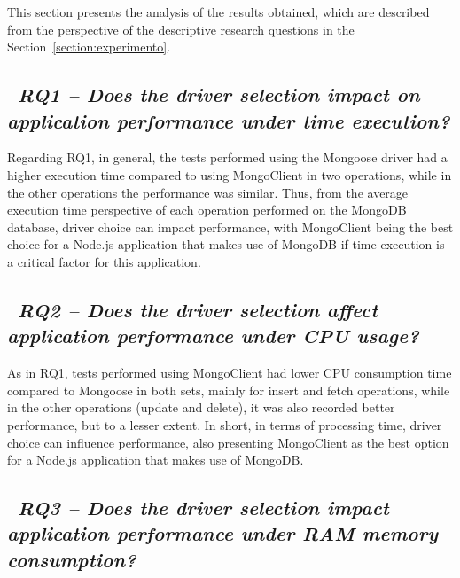 \documentclass{svproc}
\begin{document}
This section presents the analysis of the results obtained, which are described from the perspective of the descriptive research questions in the Section~\ref{section:experimento}.

\subsection{~\emph{RQ1 -- Does the driver selection impact on application performance under time execution?}}
\label{q1}

Regarding RQ1, in general, the tests performed using the Mongoose driver had a higher execution time compared to using MongoClient in two operations, while in the other operations the performance was similar.
Thus, from the average execution time perspective of each operation performed on the MongoDB database, driver choice can impact performance, with MongoClient being the best choice for a Node.js application that makes use of MongoDB if time execution is a critical factor for this application.

\subsection{~\emph{RQ2 -- Does the driver selection affect application performance under CPU usage?}}
\label{q2}

As in RQ1, tests performed using MongoClient had lower CPU consumption time compared to Mongoose in both sets, mainly for insert and fetch operations, while in the other operations (update and delete), it was also recorded better performance, but to a lesser extent.
In short, in terms of processing time, driver choice can influence performance, also presenting MongoClient as the best option for a Node.js application that makes use of MongoDB.

\subsection{~\emph{RQ3 -- Does the driver selection impact application performance under RAM memory consumption?}}
\label{q3}
\end{document}
